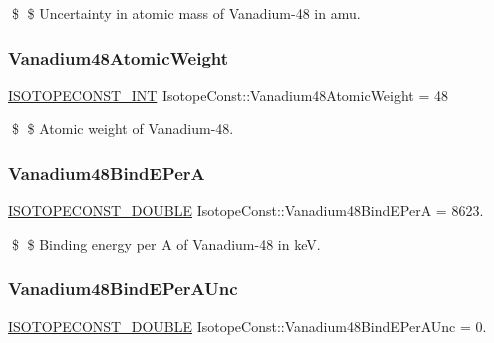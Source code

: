 \$ \$ Uncertainty in atomic mass of Vanadium-\/48 in amu. \mbox{\label{group___isotope_const-_vanadium-_v48_ga996f68c61837151fe38acc37a4987633}} 
\subsubsection{\texorpdfstring{Vanadium48\+Atomic\+Weight}{Vanadium48AtomicWeight}}
{\footnotesize\ttfamily \mbox{\hyperlink{group___isotope_const-_macros_ga5f18360b3e99483a35c32d789e62621c}{I\+S\+O\+T\+O\+P\+E\+C\+O\+N\+S\+T\+\_\+\+I\+NT}} Isotope\+Const\+::\+Vanadium48\+Atomic\+Weight = 48}

\$ \$ Atomic weight of Vanadium-\/48. \mbox{\label{group___isotope_const-_vanadium-_v48_gabdb4d2627bca66a2f52e61b1f43cd3ec}} 
\subsubsection{\texorpdfstring{Vanadium48\+Bind\+E\+PerA}{Vanadium48BindEPerA}}
{\footnotesize\ttfamily \mbox{\hyperlink{group___isotope_const-_macros_ga8f45a7272ce02c0b4c65c44636ed719a}{I\+S\+O\+T\+O\+P\+E\+C\+O\+N\+S\+T\+\_\+\+D\+O\+U\+B\+LE}} Isotope\+Const\+::\+Vanadium48\+Bind\+E\+PerA = 8623.}

\$ \$ Binding energy per A of Vanadium-\/48 in keV. \mbox{\label{group___isotope_const-_vanadium-_v48_gac3b8c7a8bf026b45ee8d9b9d9f6193b7}} 
\subsubsection{\texorpdfstring{Vanadium48\+Bind\+E\+Per\+A\+Unc}{Vanadium48BindEPerAUnc}}
{\footnotesize\ttfamily \mbox{\hyperlink{group___isotope_const-_macros_ga8f45a7272ce02c0b4c65c44636ed719a}{I\+S\+O\+T\+O\+P\+E\+C\+O\+N\+S\+T\+\_\+\+D\+O\+U\+B\+LE}} Isotope\+Const\+::\+Vanadium48\+Bind\+E\+Per\+A\+Unc = 0.}

